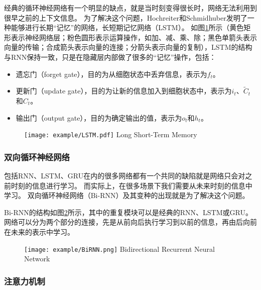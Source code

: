 经典的循环神经网络有一个明显的缺点，就是当时刻变得很长时，网络无法利用到很早之前的上下文信息。
为了解决这个问题，Hochreiter和Schmidhuber发明了一种能够进行长期“记忆”的网络，长短期记忆网络（LSTM）\cite{goodfellow2016deep}。
如图\ref{fig:LSTM}所示（黄色矩形表示神经网络层；粉色圆形表示运算操作，如加、减、乘、除；黑色单箭头表示向量的传输；合成箭头表示向量的连接；分箭头表示向量的复制），LSTM的结构与RNN保持一致，只是在隐藏层内部做了很多的“记忆”操作，包括：

\begin{itemize}
   \item 遗忘门（forget gate），目的为从细胞状态中丢弃信息，表示为$f_t$。
   \item 更新门（update gate），目的为让新的信息加入到细胞状态中，表示为$i_t$、$\widetilde{C}_t$和$C_t$。
   \item 输出门（output gate），目的为确定输出的值，表示为$o_t$和$h_t$。
\end{itemize}

\begin{figure}[!htp]
  \centering
  \texttt{[image: example/LSTM.pdf]}
    {Long Short-Term Memory}
  \label{fig:LSTM}
\end{figure}

\subsubsection{双向循环神经网络}

包括RNN、LSTM、GRU在内的很多网络都有一个共同的缺陷就是网络只会对之前时刻的信息进行学习。
而实际上，在很多场景下我们需要从未来时刻的信息中学习。
双向循环神经网络（Bi-RNN）及其变种的出现就是为了解决这个问题。

Bi-RNN的结构如图\ref{fig:BiRNN}所示，其中的重复模块可以是经典的RNN、LSTM或GRU。
网络可以分为两个部分的连接，先是从前向后执行学习到以前的信息，再由后向前在未来的表示中学习。

\begin{figure}[!htp]
  \centering
  \texttt{[image: example/BiRNN.png]}
    {Bidirectional Recurrent Neural Network}
  \label{fig:BiRNN}
\end{figure}

\subsubsection{注意力机制}

